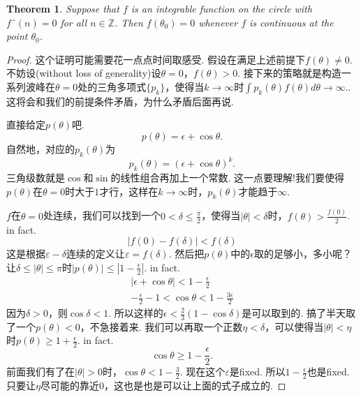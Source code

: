 \documentclass{article}
\newtheorem{theorem}{Theorem}[section]
\begin{document}
\begin{theorem}
Suppose that $f$ is an integrable function on the circle with
$fˆ(n)=0$ for all $n \in \mathbb{Z}$. Then $f(θ_0)= 0$ whenever $f$ is continuous at the point $θ_0$.
\end{theorem}

\begin{proof}
这个证明可能需要花一点点时间取感受. 假设在满足上述前提下$f(\theta) \neq 0$. 不妨设(without loss of generality)设$\theta = 0$，$f(\theta) > 0$. 接下来的策略就是构造一系列波峰在$\theta=0$处的三角多项式$\{p_k\}$，使得当$k \rightarrow \infty$时$\int p_k(\theta)f(\theta)d\theta \rightarrow \infty.$. 这将会和我们的前提条件矛盾，为什么矛盾后面再说.

直接给定$p(\theta)$吧.
$$
	p(\theta) = \epsilon + \cos \theta.
$$
自然地，对应的$p_k(\theta)$为
$$
	p_k(\theta) = (\epsilon + \cos \theta)^k.
$$
三角级数就是$\cos$和$\sin$的线性组合再加上一个常数. 这一点要理解!我们要使得$p(\theta)$在$\theta=0$时大于$1$才行，这样在$k \rightarrow \infty$时，$p_k(\theta)$才能趋于$\infty$.

$f$在$\theta=0$处连续，我们可以找到一个$0 < \delta \leq \frac{\pi}{2}$，使得当$|\theta| < \delta$时，$f(\theta) > \frac{f(0)}{2}$. in fact.
$$
  |f(0)-f(\delta)| < f(\delta) 
$$
这是根据$\varepsilon-\delta$连续的定义让$\varepsilon = f(\delta)$. 然后把$p(\theta)$中的$\epsilon$取的足够小，多小呢？让$\delta \leq |\theta| \leq \pi$时$|p(\theta)| \leq |1-\frac{\epsilon}{2}|$. in fact.
$$
\begin{aligned}
|\epsilon + \cos \theta| < 1-\frac{\epsilon}{2} \\
-\frac{\epsilon}{2} - 1<\cos \theta < 1 - \frac{3\epsilon}{2}
\end{aligned}
$$
因为$\delta > 0$，则$\cos \delta < 1$. 所以这样的$\epsilon <\frac23 (1-\cos \delta)$是可以取到的. 搞了半天取了一个$p(\theta)<0$，不急接着来. 我们可以再取一个正数$\eta < \delta$，可以使得当$|\theta| < \eta$时$p(\theta) \geq 1 + \frac{\epsilon}{2}$. in fact.
$$
\cos \theta \geq 1 - \frac{\epsilon}{2}.
$$
前面我们有了在$|\theta| > 0$时，$\cos \theta < 1 - \frac{3}{2}$. 现在这个$\varepsilon$是fixed. 所以$1-\frac{\epsilon}{2}$也是fixed. 只要让$\eta$尽可能的靠近$0$，这也是也是可以让上面的式子成立的.


\end{proof}
\end{document}
